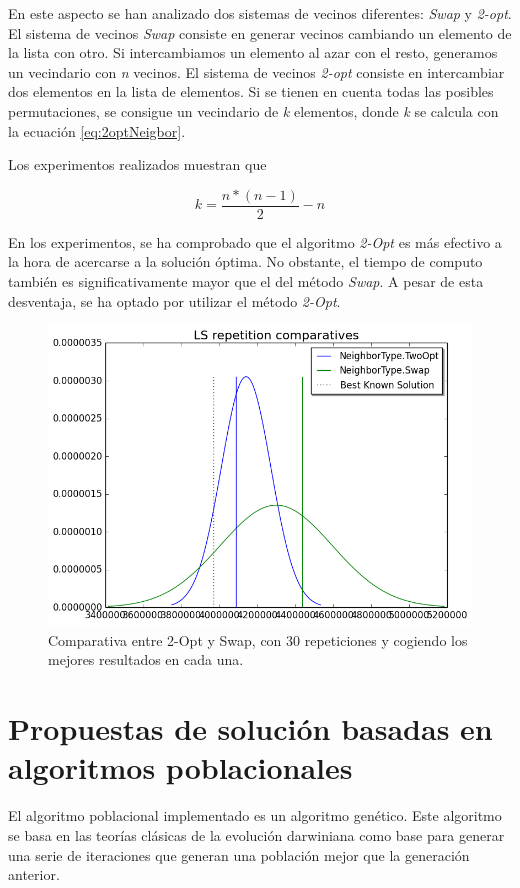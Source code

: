 \documentclass[10pt,a4paper]{article}
\begin{document}
En este aspecto se han analizado dos sistemas de vecinos diferentes: \textit{Swap} y \textit{2-opt}.
El sistema de vecinos \textit{Swap} consiste en generar vecinos cambiando un elemento de la lista con otro. Si intercambiamos un elemento al azar con el resto, generamos un vecindario con \textit{n} vecinos.
El sistema de vecinos \textit{2-opt} consiste en intercambiar dos elementos en la lista de elementos. Si se tienen en cuenta todas las posibles permutaciones, se consigue un vecindario de \textit{k} elementos, donde \textit{k} se calcula con la ecuación \ref{eq:2optNeigbor}.

Los experimentos realizados muestran que 

\begin{equation}
\label{eq:2optNeigbor}
k = \frac{n*(n-1)}{2}-n
\end{equation}

En los experimentos, se ha comprobado que el algoritmo \textit{2-Opt} es más efectivo a la hora de acercarse a la solución óptima. No obstante, el tiempo de computo también es significativamente mayor que el del método \textit{Swap}. A pesar de esta desventaja, se ha optado por utilizar el método \textit{2-Opt}.

\begin{figure}[h]
\centering
\includegraphics[scale=0.4]{optSwapComparative.png} 
\caption{Comparativa entre 2-Opt y Swap, con 30 repeticiones y cogiendo los mejores resultados en cada una.}
\label{fig:optSwapComparison}
\end{figure}



\section{Propuestas de solución basadas en algoritmos poblacionales}
El algoritmo poblacional implementado es un algoritmo genético. Este algoritmo se basa en las teorías clásicas de la evolución darwiniana como base para generar una serie de iteraciones que generan una población mejor que la generación anterior.
\end{document}
